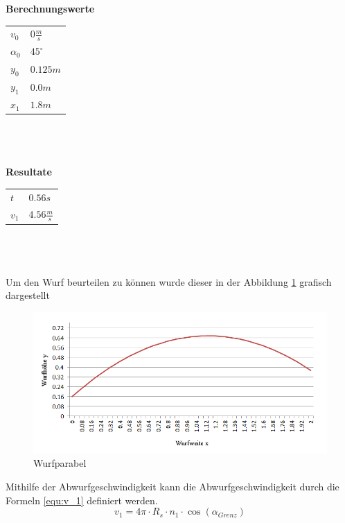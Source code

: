 \newpage
\textbf{Berechnungswerte}\\
\begin{tabular}{ll}
	\rule{0pt}{11pt} $v_0$ & $0 \frac{m}{s}$ \\
	\rule{0pt}{11pt} $\alpha_0$ & $45^\circ$ \\
	\rule{0pt}{11pt} $y_0$ & $0.125 m$ \\
	\rule{0pt}{11pt} $y_1$ & $0.0 m$ \\
	\rule{0pt}{11pt} $x_1$ & $1.8 m$ \\
\end{tabular}\\
\\
\\
\textbf{Resultate}\\
\begin{tabular}{ll}
	\rule{0pt}{11pt} $t$ & $0.56 s$ \\
	\rule{0pt}{11pt} $v_1$ & $4.56 \frac{m}{s}$ \\
\end{tabular}\\
\\
\\
Um den Wurf beurteilen zu können wurde dieser in der Abbildung \ref{fig:Wurfparabel} 
grafisch dargestellt
\begin{figure}[h!]
	\centering
	\includegraphics[width=1\textwidth,clip,trim=7mm 7mm 7mm 0mm]
	{Enddokumentation/Anhang/Bilder/Schiefer_Wurf.jpg}
	\caption{Wurfparabel}
	\label{fig:Wurfparabel}
\end{figure}
Mithilfe der Abwurfgeschwindigkeit kann die Abwurfgeschwindigkeit durch die Formeln 
\ref{equ:v_1} definiert werden.
\begin{equation}  
    v_1 = 4\pi \cdot R_s \cdot n_1 \cdot \cos(\alpha_{Grenz})
    \label{equ:v_1}
\end{equation}

